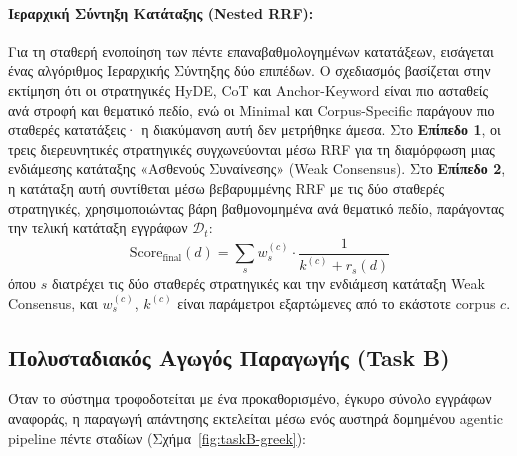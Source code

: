 \paragraph{Ιεραρχική Σύντηξη Κατάταξης (Nested RRF):}
Για τη σταθερή ενοποίηση των πέντε επαναβαθμολογημένων κατατάξεων, εισάγεται ένας αλγόριθμος Ιεραρχικής Σύντηξης δύο επιπέδων. Ο σχεδιασμός βασίζεται στην εκτίμηση ότι οι στρατηγικές HyDE, CoT και Anchor-Keyword είναι πιο ασταθείς ανά στροφή και θεματικό πεδίο, ενώ οι Minimal και Corpus-Specific παράγουν πιο σταθερές κατατάξεις· η διακύμανση αυτή δεν μετρήθηκε άμεσα. Στο \textbf{Επίπεδο 1}, οι τρεις διερευνητικές στρατηγικές συγχωνεύονται μέσω RRF για τη διαμόρφωση μιας ενδιάμεσης κατάταξης «Ασθενούς Συναίνεσης» (Weak Consensus). Στο \textbf{Επίπεδο 2}, η κατάταξη αυτή συντίθεται μέσω βεβαρυμμένης RRF με τις δύο σταθερές στρατηγικές, χρησιμοποιώντας βάρη βαθμονομημένα ανά θεματικό πεδίο, παράγοντας την τελική κατάταξη εγγράφων $\mathcal{D}_t$:
\begin{equation}
\text{Score}_{\text{final}}(d) = \sum_{s} w_s^{(c)} \cdot \frac{1}{k^{(c)} + r_s(d)}
\end{equation}
όπου $s$ διατρέχει τις δύο σταθερές στρατηγικές και την ενδιάμεση κατάταξη Weak Consensus, και $w_s^{(c)}$, $k^{(c)}$ είναι παράμετροι εξαρτώμενες από το εκάστοτε corpus $c$.

\subsection{Πολυσταδιακός Αγωγός Παραγωγής (Task B)}

Όταν το σύστημα τροφοδοτείται με ένα προκαθορισμένο, έγκυρο σύνολο εγγράφων αναφοράς, η παραγωγή απάντησης εκτελείται μέσω ενός αυστηρά δομημένου agentic pipeline πέντε σταδίων (Σχήμα~\ref{fig:taskB-greek}):


